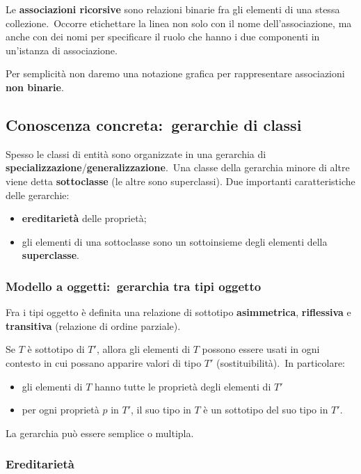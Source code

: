 Le \textbf{associazioni ricorsive} sono relazioni binarie fra gli elementi di una stessa collezione.\
Occorre etichettare la linea non solo con il nome dell'associa\-zione, ma anche con dei nomi per specificare il ruolo che hanno i due compo\-nenti in un'istanza di associazione.\

Per semplicità non daremo una notazione grafica per rappresentare associazioni \textbf{non binarie}.

\subsection{Conoscenza concreta:\ gerarchie di classi}

Spesso le classi di entità sono organizzate in una gerarchia di \textbf{specializzazione}/\textbf{generalizzazione}.\
Una classe della gerarchia minore di altre viene detta \textbf{sottoclasse} (le altre sono superclassi).
Due importanti caratteristiche delle gerarchie:
\begin{itemize}
	\item \textbf{ereditarietà} delle proprietà;
	\item gli elementi di una sottoclasse sono un sottoinsieme degli elementi della \textbf{superclasse}.
\end{itemize}

\subsubsection{Modello a oggetti:\ gerarchia tra tipi oggetto}

Fra i tipi oggetto è definita una relazione di sottotipo \textbf{asimmetrica}, \textbf{riflessiva} e \textbf{transitiva} (relazione di ordine parziale).\

Se $T$ è sottotipo di $T'$, allora gli elementi di $T$ possono essere usati in ogni contesto in cui possano apparire valori di tipo $T'$ (sostituibilità).\
In particolare:
\begin{itemize}
	\item gli elementi di $T$ hanno tutte le proprietà degli elementi di $T'$
	\item per ogni proprietà $p$ in $T'$, il suo tipo in $T$ è un sottotipo del suo tipo in $T'$.
\end{itemize}
La gerarchia può essere semplice o multipla.

\subsubsection{Ereditarietà}

